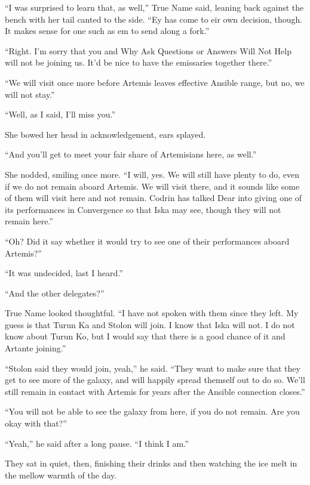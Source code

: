``I was surprised to learn that, as well,'' True Name said, leaning back against the bench with her tail canted to the side. ``Ey has come to eir own decision, though. It makes sense for one such as em to send along a fork.''

``Right. I'm sorry that you and Why Ask Questions or Answers Will Not Help will not be joining us. It'd be nice to have the emissaries together there.''

``We will visit once more before Artemis leaves effective Ansible range, but no, we will not stay.''

``Well, as I said, I'll miss you.''

She bowed her head in acknowledgement, ears splayed.

``And you'll get to meet your fair share of Artemisians here, as well.''

She nodded, smiling once more. ``I will, yes. We will still have plenty to do, even if we do not remain aboard Artemis. We will visit there, and it sounds like some of them will visit here and not remain. Codrin has talked Dear into giving one of its performances in Convergence so that Iska may see, though they will not remain here.''

``Oh? Did it say whether it would try to see one of their performances aboard Artemis?''

``It was undecided, last I heard.''

``And the other delegates?''

True Name looked thoughtful. ``I have not spoken with them since they left. My guess is that Turun Ka and Stolon will join. I know that Iska will not. I do not know about Turun Ko, but I would say that there is a good chance of it and Artante joining.''

``Stolon said they would join, yeah,'' he said. ``They want to make sure that they get to see more of the galaxy, and will happily spread themself out to do so. We'll still remain in contact with Artemis for years after the Ansible connection closes.''

``You will not be able to see the galaxy from here, if you do not remain. Are you okay with that?''

``Yeah,'' he said after a long pause. ``I think I am.''

They sat in quiet, then, finishing their drinks and then watching the ice melt in the mellow warmth of the day.
